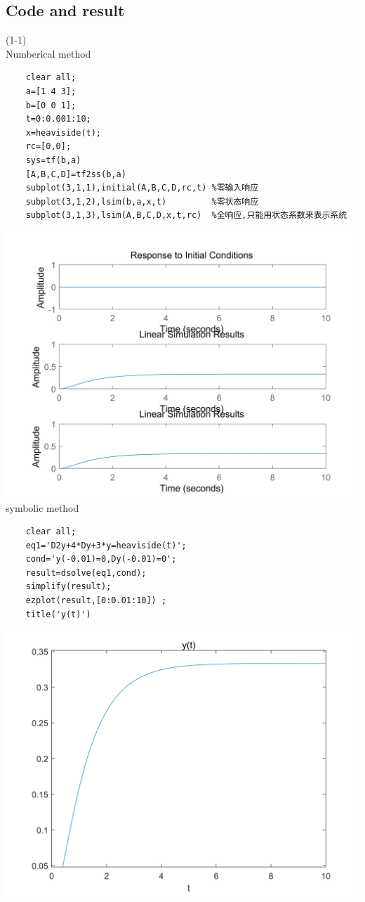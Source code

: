 \documentclass[UTF8,a4paper]{article}
\begin{document}
\subsection{Code and result}
(1-1)\\
Numberical method\\
\begin{lstlisting}
	clear all;
	a=[1 4 3];
	b=[0 0 1];
	t=0:0.001:10;
	x=heaviside(t);
	rc=[0,0];
	sys=tf(b,a)
	[A,B,C,D]=tf2ss(b,a)
	subplot(3,1,1),initial(A,B,C,D,rc,t) %零输入响应
	subplot(3,1,2),lsim(b,a,x,t)         %零状态响应
	subplot(3,1,3),lsim(A,B,C,D,x,t,rc)  %全响应,只能用状态系数来表示系统
\end{lstlisting}
\includegraphics[scale=0.9]{数值1-1.png}
symbolic method\\
\begin{lstlisting}
	clear all;
	eq1='D2y+4*Dy+3*y=heaviside(t)';
	cond='y(-0.01)=0,Dy(-0.01)=0';
	result=dsolve(eq1,cond);
	simplify(result);
	ezplot(result,[0:0.01:10]) ;
	title('y(t)')	
\end{lstlisting}
\includegraphics[scale=1]{符号法/1-1.png}\\
\end{document}
